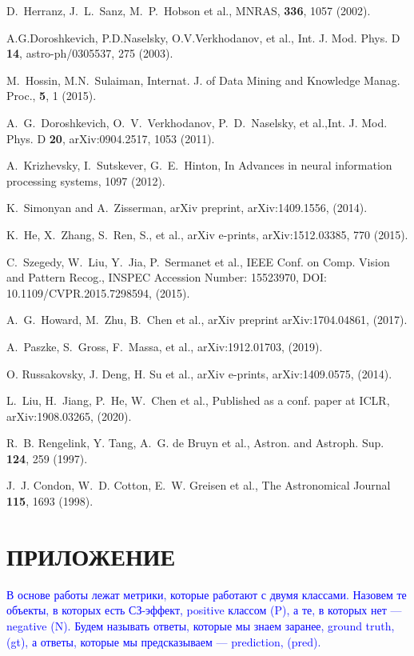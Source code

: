 \documentclass[
aps,%
12pt,%
final,%
notitlepage,%
oneside,%
onecolumn,%
nobibnotes,%
nofootinbib,%
superscriptaddress,%
noshowpacs,%
centertags]%
{revtex4}
\begin{document}
\begin{thebibliography}{99}
 D.~Herranz, J.~L.~Sanz, M.~P.~Hobson et al., MNRAS, {\bf 336}, 1057 (2002).

A.G.Doroshkevich, P.D.Naselsky, O.V.Verkhodanov, et al., Int. J. Mod. Phys. D {\bf 14}, astro-ph/0305537, 275 (2003).


M.~Hossin, M.N.~Sulaiman, Internat. J. of Data Mining and Knowledge Manag. Proc., {\bf 5}, 1 (2015).

A.~G.~Doroshkevich, O.~V.~Verkhodanov, P.~D.~Naselsky, et al.,{Int. J. Mod. Phys.} D {\bf 20}, arXiv:0904.2517, 1053 (2011).


A.~Krizhevsky, I.~Sutskever, G.~E.~Hinton, In Advances in neural information processing systems, 1097 (2012).

K.~Simonyan and A.~Zisserman, arXiv preprint, arXiv:1409.1556, (2014).


K.~He, X.~Zhang, S.~Ren, S., et al., arXiv e-prints, arXiv:1512.03385, 770 (2015).

C.~Szegedy, W.~Liu, Y.~Jia, P.~Sermanet et al., IEEE Conf. on Comp. Vision and Pattern Recog., INSPEC Accession Number: 15523970, DOI: 10.1109/CVPR.2015.7298594, (2015).

A.~G.~Howard, M.~Zhu, B.~Chen et al., arXiv preprint arXiv:1704.04861, (2017).


A.~Paszke, S.~Gross, F.~Massa, et al.,  arXiv:1912.01703, (2019). 

O. Russakovsky, J. Deng, H. Su et al., arXiv e-prints, arXiv:1409.0575, (2014).

L.~Liu, H.~Jiang, P.~He, W.~Chen et al., Published as a conf. paper at ICLR, arXiv:1908.03265, (2020).

 R.~B. Rengelink, Y. Tang,  A.~G. de Bruyn et al., Astron. and Astroph. Sup. {\bf 124}, 259 (1997).

 J.~J. Condon, W.~D. Cotton, E.~W. Greisen et al.,
 The Astronomical Journal {\bf 115}, 1693 (1998).
 
\end{thebibliography}


\section{ПРИЛОЖЕНИЕ}
\label{sec:conclusion1}

\textcolor{blue}{В основе работы лежат метрики, которые работают с двумя классами. Назовем те объекты, в которых есть СЗ-эффект, positive классом (P), а те, в которых нет --- negative (N). Будем называть ответы, которые мы знаем заранее, ground truth, (gt), а ответы, которые мы предсказываем --- prediction, (pred).}
\end{document}
